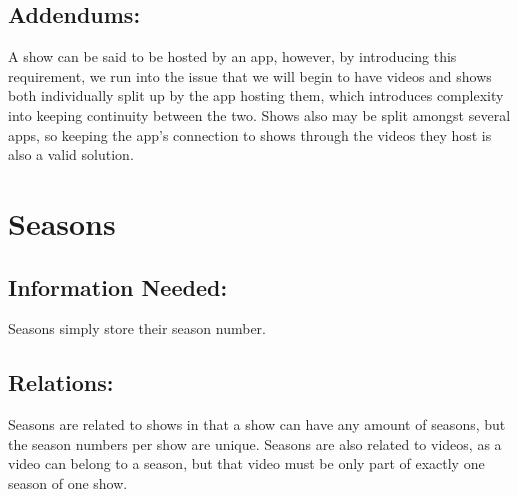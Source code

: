 \documentclass{neu_handout}
\begin{document}
\subsection{Addendums:}
A show can be said to be hosted by an app, however, by introducing this requirement, we run into the issue that we will begin to have videos and shows both individually split up by the app hosting them, which introduces complexity into keeping continuity between the two. Shows also may be split amongst several apps, so keeping the app's connection to shows through the videos they host is also a valid solution.

\section{Seasons}

\subsection{Information Needed:}
Seasons simply store their season number.

\subsection{Relations:}
 Seasons are related to shows in that a show can have any amount of seasons, but the season numbers per show are unique. Seasons are also related to videos, as a video can belong to a season, but that video must be only part of exactly one season of one show.
\end{document}

